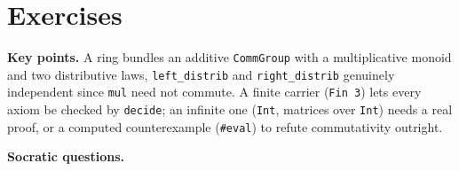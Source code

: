 \section{Exercises}\label{sec:08-rings:08-exercises:1}

\textbf{Key points.} A ring bundles an additive \texttt{CommGroup} with a multiplicative monoid and two distributive laws, \texttt{left\_\allowbreak{}distrib} and \texttt{right\_\allowbreak{}distrib} genuinely independent since \texttt{mul} need not commute. A finite carrier (\texttt{Fin 3}) lets every axiom be checked by \texttt{decide}; an infinite one (\texttt{Int}, matrices over \texttt{Int}) needs a real proof, or a computed counterexample (\texttt{\#eval}) to refute commutativity outright.

\textbf{Socratic questions.}

